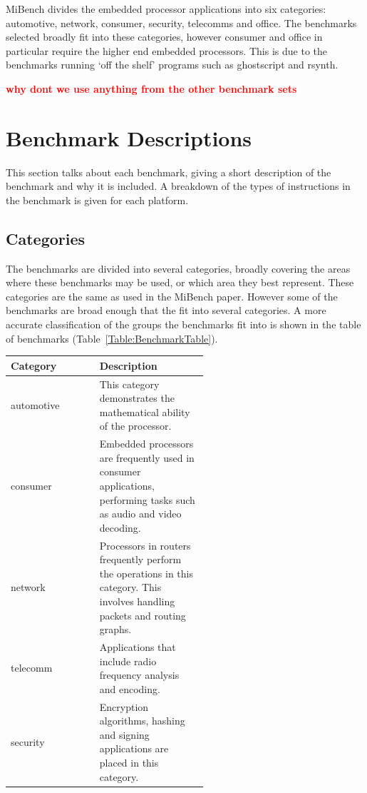 \documentclass[twocolumn]{article}
\newcommand{\nsection}[1]{\section{\bfseries #1}}
\newcommand{\todo}[1]{\textbf{\textcolor{red}{#1}}}
\begin{document}
MiBench divides the embedded processor applications into six categories: automotive, network, consumer, security, telecomms and office. The benchmarks selected broadly fit into these categories, however consumer and office in particular require the higher end embedded processors. This is due to the benchmarks running `off the shelf' programs such as ghostscript and rsynth.

\todo{why dont we use anything from the other benchmark sets}

\nsection{Benchmark Descriptions}

This section talks about each benchmark, giving a short description of the benchmark and why it is included. A breakdown of the types of instructions in the benchmark is given for each platform.

\subsection*{Categories}

The benchmarks are divided into several categories, broadly covering the areas where these benchmarks may be used, or which area they best represent. These categories are the same as used in the MiBench paper. However some of the benchmarks are broad enough that the fit into several categories. A more accurate classification of the groups the benchmarks fit into is shown in the table of benchmarks (Table~\ref{Table:BenchmarkTable}).

\begin{center}
	\begin{tabular}{l p{0.55\linewidth}}
		Category &	Description \\
		\hline
		automotive 	& This category demonstrates the mathematical ability of the processor. \\
		consumer	& Embedded processors are frequently used in consumer applications, performing tasks such as audio and video decoding. \\
		network		& Processors in routers frequently perform the operations in this category. This involves handling packets and routing graphs. \\
		telecomm	& Applications that include radio frequency analysis and encoding. \\
		security	& Encryption algorithms, hashing and signing applications are placed in this category. \\
	\end{tabular}
\end{center}
\end{document}
